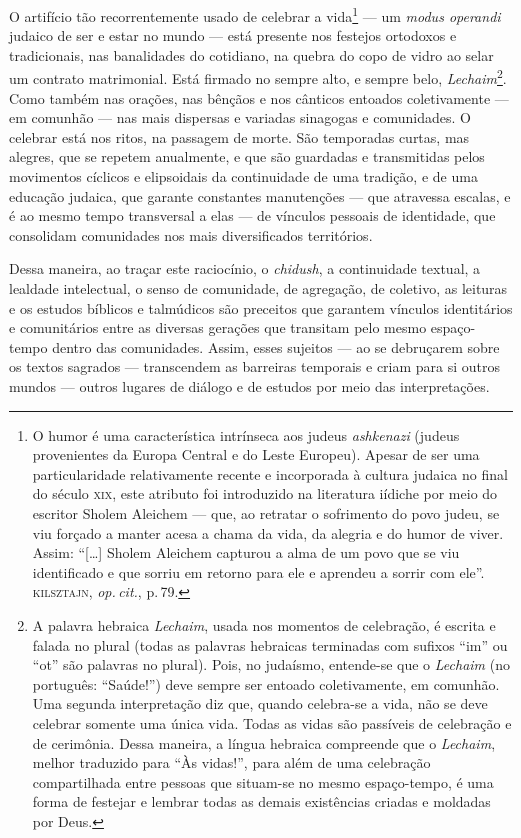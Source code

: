 O artifício tão recorrentemente usado de celebrar a vida\footnote{O
  humor é uma característica intrínseca aos judeus \emph{ashkenazi}
  (judeus provenientes da Europa Central e do Leste Europeu). Apesar de
  ser uma particularidade relativamente recente e incorporada à cultura
  judaica no final do século \textsc{xix}, este atributo foi introduzido na
  literatura iídiche por meio do escritor Sholem Aleichem ---
  que, ao retratar o sofrimento do povo judeu, se viu forçado a manter
  acesa a chama da vida, da alegria e do humor de viver. Assim:
  ``{[}\ldots{}{]} Sholem Aleichem capturou a alma de um povo que se
  viu identificado e que sorriu em retorno para ele e aprendeu a sorrir
  com ele''. \textsc{kilsztajn}, \emph{op.\,cit.}, p.\,79.} --- um \emph{modus operandi}
judaico de ser e estar no mundo --- está presente nos festejos ortodoxos
e tradicionais, nas banalidades do cotidiano, na quebra do copo de vidro
ao selar um contrato matrimonial. Está firmado no sempre alto, e sempre
belo, \emph{Lechaim}\footnote{A palavra hebraica \emph{Lechaim}, usada
  nos momentos de celebração, é escrita e falada no plural (todas as
  palavras hebraicas terminadas com sufixos ``im'' ou ``ot'' são
  palavras no plural). Pois, no judaísmo, entende-se que o
  \emph{Lechaim} (no português: ``Saúde!'') deve sempre ser entoado
  coletivamente, em comunhão. Uma segunda interpretação diz que, quando
  celebra-se a vida, não se deve celebrar somente uma única vida. Todas
  as vidas são passíveis de celebração e de cerimônia. Dessa maneira, a
  língua hebraica compreende que o \emph{Lechaim}, melhor traduzido para
  ``Às vidas!'', para além de uma celebração compartilhada entre pessoas
  que situam-se no mesmo espaço-tempo, é uma forma de festejar e lembrar
  todas as demais existências criadas e moldadas por Deus.}. Como também
nas orações, nas bênçãos e nos cânticos entoados coletivamente --- em
comunhão --- nas mais dispersas e variadas sinagogas e comunidades. O
celebrar está nos ritos, na passagem de morte. São temporadas curtas,
mas alegres, que se repetem anualmente, e que são guardadas e
transmitidas pelos movimentos cíclicos e elipsoidais da continuidade de
uma tradição, e de uma educação judaica, que garante constantes
manutenções --- que atravessa escalas, e é ao mesmo tempo transversal a
elas --- de vínculos pessoais de identidade, que consolidam comunidades
nos mais diversificados territórios.

Dessa maneira, ao traçar este raciocínio, o \emph{chidush}, a
continuidade textual, a lealdade intelectual, o senso de comunidade, de
agregação, de coletivo, as leituras e os estudos bíblicos e
talmúdicos são preceitos que garantem vínculos identitários e
comunitários entre as diversas gerações que transitam pelo mesmo
espaço-tempo dentro das comunidades. Assim, esses sujeitos --- ao se
debruçarem sobre os textos sagrados --- transcendem as barreiras
temporais e criam para si outros mundos --- outros lugares de diálogo e
de estudos por meio das interpretações.

